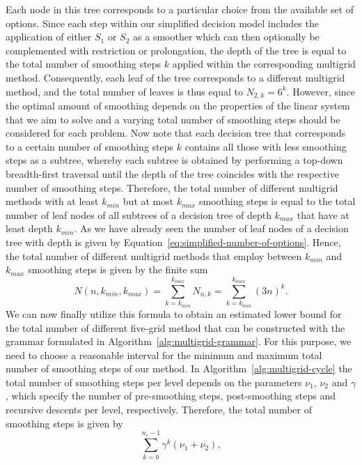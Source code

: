 Each node in this tree corresponds to a particular choice from the available set of options.
Since each step within our simplified decision model includes the application of either $S_1$ or $S_2$ as a smoother which can then optionally be complemented with restriction or prolongation, the depth of the tree is equal to the total number of smoothing steps $k$ applied within the corresponding multigrid method.
Consequently, each leaf of the tree corresponds to a different multigrid method, and the total number of leaves is thus equal to $N_{2,k} = 6^k$.
However, since the optimal amount of smoothing depends on the properties of the linear system that we aim to solve and a varying total number of smoothing steps should be considered for each problem.
Now note that each decision tree that corresponds to a certain number of smoothing steps $k$ contains all those with less smoothing steps as a subtree, whereby each subtree is obtained by performing a top-down breadth-first traversal until the depth of the tree coincides with the respective number of smoothing steps.
Therefore, the total number of different multigrid methods with at least $k_{min}$ but at most $k_{max}$ smoothing steps is equal to the total number of leaf nodes of all subtrees of a decision tree of depth $k_{max}$ that have at least depth $k_{min}$.
As we have already seen the number of leaf nodes of a decision tree with depth is given by Equation~\ref{eq:simplified-number-of-options}.
Hence, the total number of different multigrid methods that employ between $k_{min}$ and $k_{max}$ smoothing steps is given by the finite sum
\begin{equation}
	N(n, k_{min}, k_{max}) = \sum_{k = k_{min}}^{k_{max}} N_{n,k} = \sum_{k = k_{min}}^{k_{max}} (3 n)^k.
	\label{eq:search-space-estimation}
\end{equation}
We can now finally utilize this formula to obtain an estimated lower bound for the total number of different five-grid method that can be constructed with the grammar formulated in Algorithm~\ref{alg:multigrid-grammar}.
For this purpose, we need to choose a reasonable interval for the minimum and maximum total number of smoothing steps of our method.
In Algorithm~\ref{alg:multigrid-cycle} the total number of smoothing steps per level depends on the parameters $\nu_1$, $\nu_2$ and $\gamma$, which specify the number of pre-smoothing steps, post-smoothing steps and recursive descents per level, respectively.
Therefore, the total number of smoothing steps is given by
\begin{equation}
	\sum_{k = 0}^{n_c - 1} \gamma^k (\nu_1 + \nu_2),
\end{equation}
